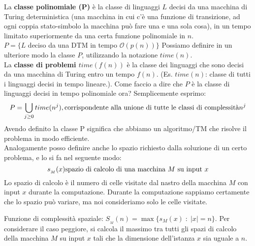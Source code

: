 La \textbf{classe polinomiale (P)} è la classe di linguaggi $L$ decisi da una macchina di Turing deterministica (una macchina in cui c’è una funzione di transizione, ad ogni coppia stato-simbolo la macchina può fare una e una sola cosa), in un tempo limitato superiormente da una certa funzione polinomiale in $n$.\\ $P = \{L$ deciso da una DTM in tempo $\mathcal{O}(p(n))\}$
Possiamo definire in un ulteriore modo la classe $P$, utilizzando la notazione $time(n)$.\\
La \textbf{classe di problemi $time(f(n))$} è la classe dei linguaggi che sono decisi da una macchina di Turing entro un tempo $f(n)$. (Es. $time(n)$: classe di tutti i linguaggi decisi in tempo lineare.). Come faccio a dire che $P$ è la classe di linguaggi decisi in tempo polinomiale ora? Semplicemente esprimo:\\
$$P = \displaystyle \bigcup_{j \geq 0} time(n^j), \textnormal{corrispondente alla unione di tutte le classi di complessità} n^j$$
Avendo definito la classe P significa che abbiamo un algoritmo/TM che risolve il problema in modo efficiente. \\
Analogamente posso definire anche lo spazio richiesto dalla soluzione di un certo problema, e lo si fa nel seguente modo:
$$s_{_M}(x)  \textnormal{spazio di calcolo di una macchina } M \textnormal{ su input } x$$
Lo spazio di calcolo è il numero di celle visitate dal nastro della macchina $M$ con input $x$ durante la computazione. Durante la computazione sappiamo certamente che lo spazio può variare, ma noi consideriamo solo le celle visitate.  

Funzione di complessità spaziale: $S_{_M}(n) = \max\{s_M(x) \; : \; |x|=n\}$. Per considerare il caso peggiore, si calcola il massimo tra tutti gli spazi di calcolo della macchina $M$ su input $x$ tali che la dimensione dell’istanza $x$ sia uguale a $n$.
